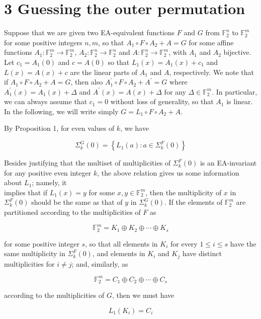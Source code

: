 \documentclass[10pt]{article}
\begin{document}
\section*{3 Guessing the outer permutation}
Suppose that we are given two EA-equivalent functions $F$ and $G$ from $\mathbb{F}_{2}^{n}$ to $\mathbb{F}_{2}^{m}$ for some positive integers $n, m$, so that $A_{1} \circ F \circ A_{2}+A=G$ for some affine functions $A_{1}: \mathbb{F}_{2}^{m} \rightarrow \mathbb{F}_{2}^{m}$, $A_{2}: \mathbb{F}_{2}^{n} \rightarrow \mathbb{F}_{2}^{n}$ and $A: \mathbb{F}_{2}^{n} \rightarrow \mathbb{F}_{2}^{m}$, with $A_{1}$ and $A_{2}$ bijective. Let $c_{1}=A_{1}(0)$ and $c=A(0)$ so that $L_{1}(x)=A_{1}(x)+c_{1}$ and $L(x)=A(x)+c$ are the linear parts of $A_{1}$ and $A$, respectively. We note that if $A_{1} \circ F \circ A_{2}+A=G$, then also $A_{1}^{\prime} \circ F \circ A_{2}+A^{\prime}=G$ where $A_{1}^{\prime}(x)=A_{1}(x)+\Delta$ and $A^{\prime}(x)=A(x)+\Delta$ for any $\Delta \in \mathbb{F}_{2}^{m}$. In particular, we can always assume that $c_{1}=0$ without loss of generality, so that $A_{1}$ is linear. In the following, we will write simply $G=L_{1} \circ F \circ A_{2}+A$.

By Proposition 1, for even values of $k$, we have

$$
\Sigma_{k}^{G}(0)=\left\{L_{1}(a): a \in \Sigma_{k}^{F}(0)\right\}
$$

Besides justifying that the multiset of multiplicities of $\Sigma_{k}^{F}(0)$ is an EA-invariant for any positive even integer $k$, the above relation gives us some information about $L_{1}$; namely, it\\
implies that if $L_{1}(x)=y$ for some $x, y \in \mathbb{F}_{2}^{m}$, then the multiplicity of $x$ in $\Sigma_{k}^{F}(0)$ should be the same as that of $y$ in $\Sigma_{k}^{G}(0)$. If the elements of $\mathbb{F}_{2}^{m}$ are partitioned according to the multiplicities of $F$ as

$$
\mathbb{F}_{2}^{m}=K_{1} \oplus K_{2} \oplus \cdots \oplus K_{s}
$$

for some positive integer $s$, so that all elements in $K_{i}$ for every $1 \leq i \leq s$ have the same multiplicity in $\Sigma_{k}^{F}(0)$, and elements in $K_{i}$ and $K_{j}$ have distinct multiplicities for $i \neq j$; and, similarly, as

$$
\mathbb{F}_{2}^{m}=C_{1} \oplus C_{2} \oplus \cdots \oplus C_{s}
$$

according to the multiplicities of $G$, then we must have

$$
L_{1}\left(K_{i}\right)=C_{i}
$$
\end{document}

